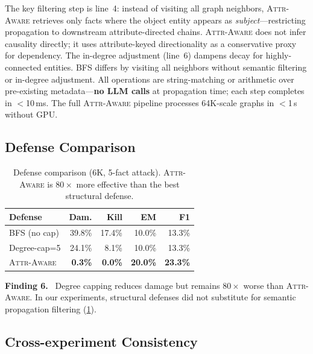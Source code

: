 \documentclass{article}
\newcommand{\attraware}{\textsc{Attr-Aware}}
\newcommand{\bfsprop}{\textsc{BFS}}
\newcommand{\finding}[1]{\vspace{2pt}\noindent\textbf{Finding #1.}~}
\begin{document}
The key filtering step is line~4: instead of visiting all graph neighbors, \attraware{} retrieves only facts where the object entity appears as \textit{subject}---restricting propagation to downstream attribute-directed chains.
\attraware{} does not infer causality directly; it uses attribute-keyed directionality as a conservative proxy for dependency.
The in-degree adjustment (line~6) dampens decay for highly-connected entities.
\bfsprop{} differs by visiting all neighbors without semantic filtering or in-degree adjustment.
All operations are string-matching or arithmetic over pre-existing metadata---\textbf{no LLM calls} at propagation time; each step completes in $<$10\,ms.
The full \attraware{} pipeline processes 64K-scale graphs in $<$1\,s without GPU.

\subsection{Defense Comparison}

\begin{table}[htbp]
\centering
\footnotesize
\begin{tabular}{lrrrr}
\toprule
\textbf{Defense} & \textbf{Dam.} & \textbf{Kill} & \textbf{EM} & \textbf{F1} \\
\midrule
\bfsprop{} (no cap) & 39.8\% & 17.4\% & 10.0\% & 13.3\% \\
Degree-cap=5 & 24.1\% & 8.1\% & 10.0\% & 13.3\% \\
\attraware{} & \textbf{0.3\%} & \textbf{0.0\%} & \textbf{20.0\%} & \textbf{23.3\%} \\
\bottomrule
\end{tabular}
\caption{Defense comparison (6K, 5-fact attack). \attraware{} is $80\times$ more effective than the best structural defense.}
\label{tab:defense}
\end{table}

\finding{6} Degree capping reduces damage but remains $80\times$ worse than \attraware{}.
In our experiments, structural defenses did not substitute for semantic propagation filtering (\cref{tab:defense}).

\subsection{Cross-experiment Consistency}
\end{document}
